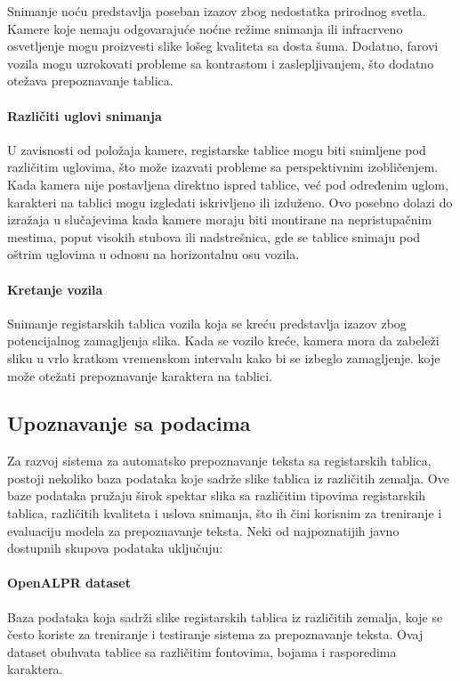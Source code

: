 \documentclass[a4paper,12pt]{article}
\begin{document}
	Snimanje noću predstavlja poseban izazov zbog nedostatka prirodnog svetla. Kamere koje nemaju odgovarajuće noćne režime snimanja ili infracrveno osvetljenje mogu proizvesti slike lošeg kvaliteta sa dosta šuma. Dodatno, farovi vozila mogu uzrokovati probleme sa kontrastom i zaslepljivanjem, što dodatno otežava prepoznavanje tablica.
	
	\paragraph{Različiti uglovi snimanja}
	U zavisnosti od položaja kamere, registarske tablice mogu biti snimljene pod različitim uglovima, što može izazvati probleme sa perspektivnim izobličenjem. Kada kamera nije postavljena direktno ispred tablice, već pod određenim uglom, karakteri na tablici mogu izgledati iskrivljeno ili izduženo. Ovo posebno dolazi do izražaja u slučajevima kada kamere moraju biti montirane na nepristupačnim mestima, poput visokih stubova ili nadstrešnica, gde se tablice snimaju pod oštrim uglovima u odnosu na horizontalnu osu vozila.
	
	\paragraph{Kretanje vozila}
	Snimanje registarskih tablica vozila koja se kreću predstavlja izazov zbog potencijalnog zamagljenja slika. Kada se vozilo kreće, kamera mora da zabeleži sliku u vrlo kratkom vremenskom intervalu kako bi se izbeglo zamagljenje. koje može otežati prepoznavanje karaktera na tablici.
	
	\subsection{Upoznavanje sa podacima}
	Za razvoj sistema za automatsko prepoznavanje teksta sa registarskih tablica, postoji nekoliko baza podataka koje sadrže slike tablica iz različitih zemalja. Ove baze podataka pružaju širok spektar slika sa različitim tipovima registarskih tablica, različitih kvaliteta i uslova snimanja, što ih čini korisnim za treniranje i evaluaciju modela za prepoznavanje teksta. Neki od najpoznatijih javno dostupnih skupova podataka uključuju:
		
	\paragraph{OpenALPR dataset}
	Baza podataka koja sadrži slike registarskih tablica iz različitih zemalja, koje se često koriste za treniranje i testiranje sistema za prepoznavanje teksta. Ovaj dataset obuhvata tablice sa različitim fontovima, bojama i rasporedima karaktera.
	
\end{document}
